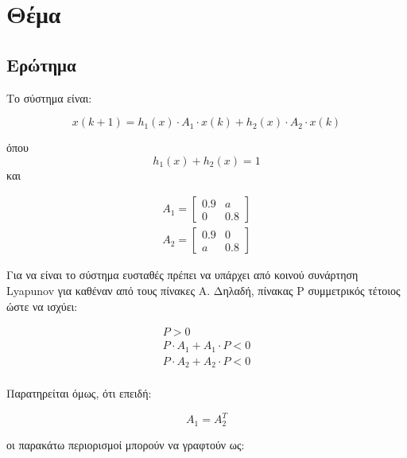 \documentclass{article}
\newcommand{\eng}[1]{\foreignlanguage{english}{#1}} %
\begin{document}
\clearpage
\section{Θέμα}

\subsection{Ερώτημα}

Το σύστημα είναι:

\begin{equation}
    x(k+1) = h_1(x) \cdot A_1 \cdot x(k) + h_2(x) \cdot A_2 \cdot x(k)
\end{equation}

όπου  
\begin{equation}
    h_1(x) + h_2(x) = 1
\end{equation}
και 

\begin{equation}
    \begin{aligned}
        Α_1 = \begin{bmatrix} 0.9 & a \\ 0 & 0.8 \end{bmatrix}\\
        A_2 = \begin{bmatrix} 0.9 & 0 \\ a & 0.8 \end{bmatrix}
    \end{aligned}
\end{equation}

Για να είναι το σύστημα ευσταθές πρέπει να υπάρχει από κοινού συνάρτηση \eng{Lyapunov}
για καθέναν από τους πίνακες Α. Δηλαδή, πίνακας P συμμετρικός τέτοιος ώστε να ισχύει:

\begin{equation}
    \begin{aligned}
        P > 0 \\
        P \cdot A_1 + A_1 \cdot P < 0 \\
        P \cdot A_2 + A_2 \cdot P < 0 \\
    \end{aligned}
\end{equation}

Παρατηρείται όμως, ότι επειδή:

\begin{equation}
    A_1 = A_2^T
\end{equation}

οι παρακάτω περιορισμοί μπορούν να γραφτούν ως:
\end{document}
